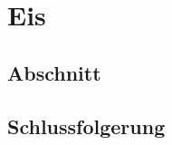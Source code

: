 %
%
%
\chapter{Eis\label{chapter:eis}}
\begin{refsection}

\section{Abschnitt}

\section{Schlussfolgerung}

\printbibliography[heading=subbibliography]
\end{refsection}
